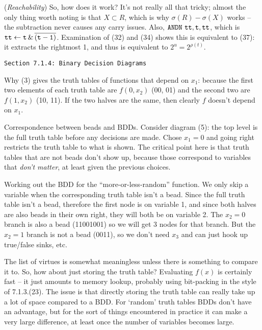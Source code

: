 \vskip 0.08in  ({\it Reachability})\hfil\break
So, how does it work?  It's not really all that tricky; almost the only
thing worth noting is that $X \subset R$, which is why $\sigma\left(R\right) -
\sigma\left(X\right)$ works -- the subtraction never causes any carry issues.
Also, ${\tt ANDN\ tt,t,tt}$, which is ${\tt tt} \gets {\tt t \, \& \, \overline{\left( t - 1 \right)}}$.
Examination of (32) and (34) shows this is equivalent to (37): it extracts the
rightmost 1, and thus is equivalent to $2^u = 2^{\rho\left(t\right)}$.

\vfil\break
\centerline{\tt Section 7.1.4: Binary Decision Diagrams}
\vskip0.2in

\noindent [p 204] Why (3) gives the truth tables of functions that
depend on $x_1$: because the first two elements of each truth table
are $f\left(0, x_2\right)$ (00, 01) and the second two are $f\left(1, x_2\right)$
(10, 11).  If the two halves are the same, then clearly $f$ doesn't
depend on $x_1$.

\vskip 0.08in \noindent [p205] Correspondence between beads and BDDs.\hfil\break
Consider diagram (5): the top level is the full truth table before any
decisions are made.  Chose $x_1 = 0$ and going right restricts
the truth table to what is shown.  The critical point here is that truth
tables that are not beads don't show up, because those correspond
to variables that {\it don't matter}, at least given the previous choices.

\vskip 0.08in \noindent [p 205] Working out the BDD for the ``more-or-less-random''
function.\hfil\break
We only skip a variable when the corresponding truth table isn't a bead.  Since
the full truth table isn't a bead, therefore the first node is on variable 1, and
since both halves are also beads in their own right, they will both be on
variable 2.  The $x_2 = 0$ branch is also a bead (11001001) so we will
get 3 nodes for that branch.  But the $x_2 = 1$ branch is not a bead
(0011), so we don't need $x_3$ and can just hook up true/false sinks, etc.

\vskip 0.08in 

\noindent [p 206] The list of virtues is somewhat meaningless unless there is something
to compare it to.  So, how about just storing the truth table?  Evaluating
$f\left(x\right)$ is certainly fast -- it just amounts to memory lookup, probably
using bit-packing in the style of 7.1.3.(23).  The issue is that directly
storing the truth table can really take up a lot of space compared to a BDD.
For `random' truth tables BDDs don't have an advantage, but for the
sort of things encountered in practice it can make a very large difference,
at least once the number of variables becomes large.  

